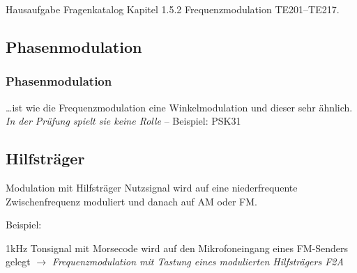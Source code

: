 \begin{frame}
  \begin{exampleblock}{Hausaufgabe}
    Fragenkatalog Kapitel 1.5.2 Frequenzmodulation TE201--TE217.
  \end{exampleblock}
\end{frame}

\subsection[PM]{Phasenmodulation}

\begin{frame}
  \frametitle{Phasenmodulation}

  \dots ist wie die Frequenzmodulation eine Winkelmodulation und dieser sehr ähnlich. \\[4em]

  \emph{In der Prüfung spielt sie keine Rolle} -- Beispiel: PSK31

\end{frame}


\subsection{Hilfsträger}
\begin{frame}{Modulation mit Hilfsträger}
  Nutzsignal wird auf eine niederfrequente Zwischenfrequenz moduliert und danach auf AM oder FM.
  \vspace{4em}

  Beispiel: \bigskip

  1kHz Tonsignal mit Morsecode wird auf den Mikrofoneingang eines FM-Senders gelegt
  $\rightarrow$ \emph{Frequenzmodulation mit Tastung eines modulierten Hilfsträgers F2A}
\end{frame}

